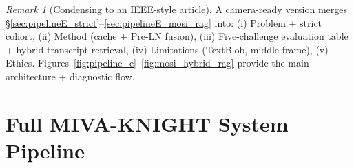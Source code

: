 \documentclass[12pt,a4paper]{article}
\theoremstyle{definition}
\theoremstyle{plain}
\theoremstyle{remark}
\newtheorem{remark}{Remark}[section]
\begin{document}
\begin{remark}[Condensing to an IEEE-style article]
A camera-ready version merges \S\ref{sec:pipelineE_strict}--\ref{sec:pipelineE_mosi_rag} into: (i) Problem + strict cohort, (ii) Method (cache + Pre-LN fusion), (iii) Five-challenge evaluation table + hybrid transcript retrieval, (iv) Limitations (TextBlob, middle frame), (v) Ethics. Figures~\ref{fig:pipeline_e}--\ref{fig:mosi_hybrid_rag} provide the main architecture + diagnostic flow.
\end{remark}

\newpage
\section{Full MIVA-KNIGHT System Pipeline}
\label{sec:system}
\end{document}
